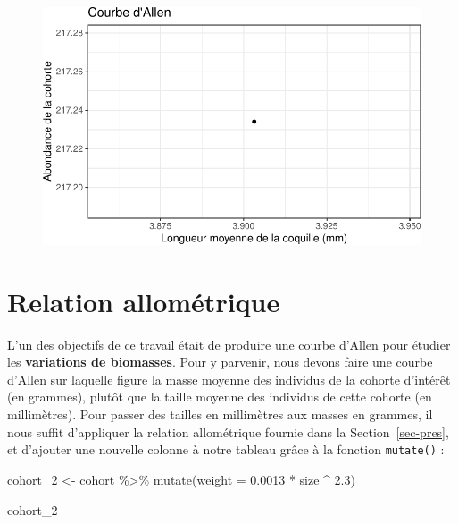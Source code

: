 \documentclass[
  a4paper,
  DIV=11,
  numbers=noendperiod,
  oneside]{scrreprt}
\newenvironment{Shaded}{}{}
\newcommand{\AttributeTok}[1]{\textcolor[rgb]{0.84,0.23,0.29}{#1}}
\newcommand{\FloatTok}[1]{\textcolor[rgb]{0.00,0.36,0.77}{#1}}
\newcommand{\FunctionTok}[1]{\textcolor[rgb]{0.44,0.26,0.76}{#1}}
\newcommand{\NormalTok}[1]{\textcolor[rgb]{0.14,0.16,0.18}{#1}}
\newcommand{\OtherTok}[1]{\textcolor[rgb]{0.44,0.26,0.76}{#1}}
\newcommand{\SpecialCharTok}[1]{\textcolor[rgb]{0.00,0.36,0.77}{#1}}
\begin{document}
\begin{figure}[H]


{\centering \includegraphics{04-Cohortes_files/figure-pdf/fig-allen-1.pdf}

}

\end{figure}

\hypertarget{relation-allomuxe9trique}{%
\section{Relation allométrique}\label{relation-allomuxe9trique}}

L'un des objectifs de ce travail était de produire une courbe d'Allen
pour étudier les \textbf{variations de biomasses}. Pour y parvenir, nous
devons faire une courbe d'Allen sur laquelle figure la masse moyenne des
individus de la cohorte d'intérêt (en grammes), plutôt que la taille
moyenne des individus de cette cohorte (en millimètres). Pour passer des
tailles en millimètres aux masses en grammes, il nous suffit d'appliquer
la relation allométrique fournie dans la Section~\ref{sec-pres}, et
d'ajouter une nouvelle colonne à notre tableau grâce à la fonction
\texttt{mutate()} :

\begin{Shaded}
\begin{Highlighting}[]
\NormalTok{cohort\_2 }\OtherTok{\textless{}{-}}\NormalTok{ cohort }\SpecialCharTok{\%\textgreater{}\%}
  \FunctionTok{mutate}\NormalTok{(}\AttributeTok{weight =} \FloatTok{0.0013} \SpecialCharTok{*}\NormalTok{ size }\SpecialCharTok{\^{}} \FloatTok{2.3}\NormalTok{)}

\NormalTok{cohort\_2}
\end{Highlighting}
\end{Shaded}
\end{document}
